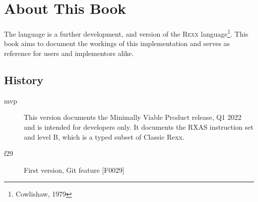 \chapter*{About This Book}
The \crexx{} language is a further development, and version of the
\textsc{Rexx} language\footnote{Cowlishaw, 1979}. This book aims to
document the workings of this implementation and serves as reference
for users and implementors alike.


\section*{History}

\begin{description}
\item[mvp] This version documents the Minimally Viable Product
  release, Q1 2022 and is intended for developers only. It documents
  the RXAS instruction set and \crexx{} level B, which is a typed
  subset of Classic Rexx.
\item[f29] First version, Git feature [F0029]
\end{description}

